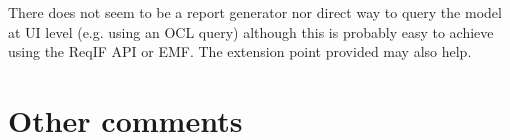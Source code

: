 \begin{assessor2}
There does not seem to be a report generator nor direct way to query the model at UI level (e.g. using an OCL query) although this is probably easy to achieve using the ReqIF API or EMF. The extension point provided may also help.
\end{assessor2}


\section{Other comments}



\begin{comment}
This section is available for the author or the assessors to  complete the description and criteria.
\end{comment}



